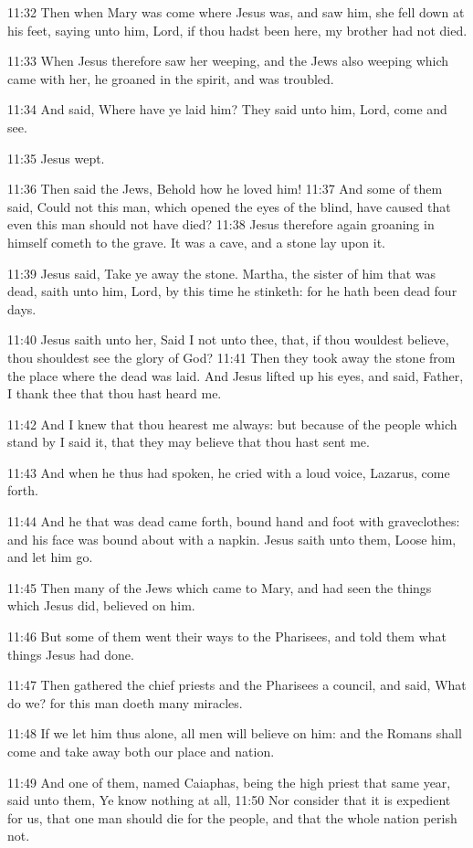 11:32 Then when Mary was come where Jesus was, and saw him, she fell down at his feet, saying unto him, Lord, if thou hadst been here, my brother had not died.

11:33 When Jesus therefore saw her weeping, and the Jews also weeping which came with her, he groaned in the spirit, and was troubled.

11:34 And said, Where have ye laid him? They said unto him, Lord, come and see.

11:35 Jesus wept.

11:36 Then said the Jews, Behold how he loved him!  11:37 And some of them said, Could not this man, which opened the eyes of the blind, have caused that even this man should not have died?  11:38 Jesus therefore again groaning in himself cometh to the grave. It was a cave, and a stone lay upon it.

11:39 Jesus said, Take ye away the stone. Martha, the sister of him that was dead, saith unto him, Lord, by this time he stinketh: for he hath been dead four days.

11:40 Jesus saith unto her, Said I not unto thee, that, if thou wouldest believe, thou shouldest see the glory of God?  11:41 Then they took away the stone from the place where the dead was laid. And Jesus lifted up his eyes, and said, Father, I thank thee that thou hast heard me.

11:42 And I knew that thou hearest me always: but because of the people which stand by I said it, that they may believe that thou hast sent me.

11:43 And when he thus had spoken, he cried with a loud voice, Lazarus, come forth.

11:44 And he that was dead came forth, bound hand and foot with graveclothes: and his face was bound about with a napkin. Jesus saith unto them, Loose him, and let him go.

11:45 Then many of the Jews which came to Mary, and had seen the things which Jesus did, believed on him.

11:46 But some of them went their ways to the Pharisees, and told them what things Jesus had done.

11:47 Then gathered the chief priests and the Pharisees a council, and said, What do we? for this man doeth many miracles.

11:48 If we let him thus alone, all men will believe on him: and the Romans shall come and take away both our place and nation.

11:49 And one of them, named Caiaphas, being the high priest that same year, said unto them, Ye know nothing at all, 11:50 Nor consider that it is expedient for us, that one man should die for the people, and that the whole nation perish not.

